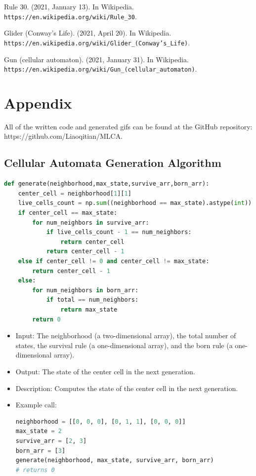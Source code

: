 \documentclass[12pt]{article}
\numberwithin{figure}{section} %
\begin{document}
\begin{thebibliography}{9}
Rule 30. (2021, January 13). In Wikipedia. 
\\\texttt{https://en.wikipedia.org/wiki/Rule\_30}.

Glider (Conway’s Life). (2021, April 20). In Wikipedia. 
\\\texttt{https://en.wikipedia.org/wiki/Glider\_(Conway’s\_Life)}.

Gun (cellular automaton). (2021, January 31). In Wikipedia. 
\\\texttt{https://en.wikipedia.org/wiki/Gun\_(cellular\_automaton)}.

\end{thebibliography}

\newpage
\renewcommand{\thesection}{A}
\section{Appendix}
All of the written code and generated gifs can be found at the GitHub repository:
https://github.com/Liaoqitian/MLCA. 
\subsection{Cellular Automata Generation Algorithm}
\label{subsection:Cellular Automata Generation Algorithm}
\begin{lstlisting}[language=Python]
def generate(neighborhood,max_state,survive_arr,born_arr):
    center_cell = neighborhood[1][1]
    live_cells_count = np.sum((neighborhood == max_state).astype(int))
    if center_cell == max_state: 
        for num_neighbors in survive_arr:
            if live_cells_count - 1 == num_neighbors: 
                return center_cell 
            return center_cell - 1
    else if center_cell != 0 and center_cell != max_state:
        return center_cell - 1
    else:
        for num_neighbors in born_arr: 
            if total == num_neighbors:
                return max_state 
        return 0
\end{lstlisting}
\vspace{-1.5em}
\begin{itemize}[leftmargin = 0.5cm, topsep=0pt,itemsep=-1ex,partopsep=1ex,parsep=1ex]
\item Input: The neighborhood (a two-dimensional array), the total number of states, the survival rule (a one-dimensional array), and the born rule (a one-dimensional array). 
\item Output: The state of the center cell in the next generation.  
\item Description: Computes the state of the center cell in the next generation. 
\item Example call: 
\begin{lstlisting}[language = Python]
neighborhood = [[0, 0, 0], [0, 1, 1], [0, 0, 0]]
max_state = 2
survive_arr = [2, 3]
born_arr = [3]
generate(neighborhood, max_state, survive_arr, born_arr) 
# returns 0
\end{lstlisting}
\end{itemize}
\end{document}
